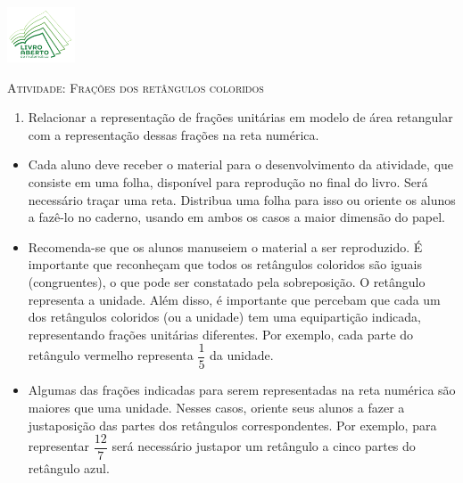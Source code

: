 \documentclass[10 pt,usenames,dvipsnames, oneside]{article}
\begin{document}
\begin{center}
  \begin{minipage}[l]{3cm}
\includegraphics[width=2cm]{../../../Figuras/logo}       
\end{minipage}\hfill
\begin{minipage}[r]{.8\textwidth}
 {\Large \scshape Atividade: Frações dos retângulos coloridos}  
\end{minipage}
\end{center}
\vspace{.2cm}

\ifdefined\prof
\begin{goals}
\begin{enumerate}
\item       Relacionar a representação de frações unitárias em modelo de área retangular com a representação dessas frações na reta numérica.
\end{enumerate}

\tcblower

\begin{itemize}
\item  Cada aluno deve receber o material para o desenvolvimento da atividade, que consiste em uma folha, disponível para reprodução no final do livro. Será necessário traçar uma reta. Distribua uma folha para isso ou oriente os alunos a fazê-lo no caderno, usando em ambos os casos a maior dimensão do papel.
\item Recomenda-se que os alunos manuseiem o material a ser reproduzido. É importante que reconheçam que todos os retângulos coloridos são iguais (congruentes), o que pode ser constatado pela sobreposição. O retângulo representa a unidade. Além disso, é importante que percebam que cada um dos retângulos coloridos (ou a unidade) tem uma equipartição indicada, representando frações unitárias diferentes. Por exemplo, cada parte do retângulo vermelho representa       $\dfrac{1}{5}$       da unidade.
\item       Algumas das frações indicadas para serem representadas na reta numérica são maiores que uma unidade. Nesses casos, oriente seus alunos a fazer a justaposição das partes dos retângulos correspondentes. Por exemplo, para representar       $\dfrac{12}{7}$       será necessário justapor um retângulo a cinco partes do retângulo azul.
\end{itemize}
\end{goals}
\end{document}
